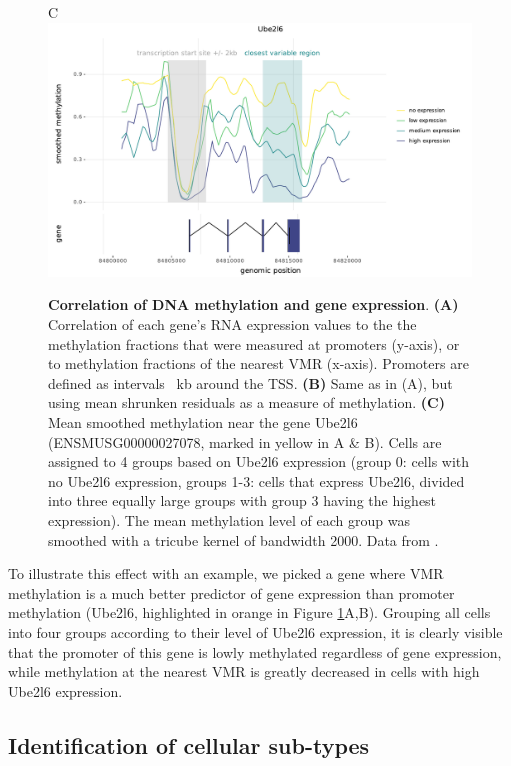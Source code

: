 \documentclass[twocolumn,10pt]{article}
\begin{document}
\begin{figure}
\begin{center}
    C\hspace{.9\columnwidth}~\\
    \includegraphics[width=.95\columnwidth]{part_leonie_git/leonie_plots/comparison_meth_RNA.pdf}
    \end{center}
    \caption{\small \textbf{Correlation of DNA methylation and gene expression}.
    \textbf{(A)} Correlation of each gene's RNA expression values to the the methylation fractions that were measured at promoters (y-axis), or to methylation fractions of the nearest VMR (x-axis). Promoters are defined as intervals ~kb around the TSS.
    \textbf{(B)} Same as in (A), but using mean shrunken residuals as a measure of methylation.
    \textbf{(C)} Mean smoothed methylation near the gene Ube2l6 (ENSMUSG00000027078, marked in yellow in A \& B). Cells are assigned to 4 groups based on Ube2l6 expression (group 0: cells with no Ube2l6 expression, groups 1-3: cells that express Ube2l6, divided into three equally large groups with group 3 having the highest expression). The mean methylation level of each group was smoothed with a tricube kernel of bandwidth 2000.
    Data from \citet{argelaguet2019gastru}.}
    \label{figure:correlation}
\end{figure}

To illustrate this effect with an example, we picked a gene where VMR methylation is a much better predictor of gene expression than promoter methylation (Ube2l6, highlighted in orange in Figure \ref{figure:correlation}A,B).
Grouping all cells into four groups according to their level of Ube2l6 expression, it is clearly visible that the promoter of this gene is lowly methylated regardless of gene expression, while methylation at the nearest VMR is greatly decreased in cells with high Ube2l6 expression.

\subsection{Identification of cellular sub-types}
\end{document}
